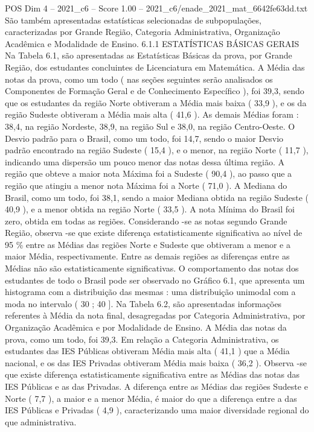 \begin{textsample}{POS Dim 4 – 2021\_c6 – Score 1.00 – 2021\_c6/enade\_2021\_mat\_6642fe63dd.txt}
São também apresentadas estatísticas selecionadas de subpopulações, caracterizadas por Grande Região, Categoria Administrativa, Organização Acadêmica e Modalidade de Ensino. 6.1.1 ESTATÍSTICAS BÁSICAS GERAIS Na Tabela 6.1, são apresentadas as Estatísticas Básicas da prova, por Grande Região, dos estudantes concluintes de Licenciatura em Matemática.
A Média das notas da prova, como um todo ( nas seções seguintes serão analisados os Componentes de Formação Geral e de Conhecimento Específico ), foi 39,3, sendo que os estudantes da região Norte obtiveram a Média mais baixa ( 33,9 ), e os da região Sudeste obtiveram a Média mais alta ( 41,6 ).
As demais Médias foram : 38,4, na região Nordeste, 38,9, na região Sul e 38,0, na região Centro-Oeste.
O Desvio padrão para o Brasil, como um todo, foi 14,7, sendo o maior Desvio padrão encontrado na região Sudeste ( 15,4 ), e o menor, na região Norte ( 11,7 ), indicando uma dispersão um pouco menor das notas dessa última região.
A região que obteve a maior nota Máxima foi a Sudeste ( 90,4 ), ao passo que a região que atingiu a menor nota Máxima foi a Norte ( 71,0 ).
A Mediana do Brasil, como um todo, foi 38,1, sendo a maior Mediana obtida na região Sudeste ( 40,9 ), e a menor obtida na região Norte ( 33,5 ).
A nota Mínima do Brasil foi zero, obtida em todas as regiões.
Considerando -se as notas segundo Grande Região, observa -se que existe diferença estatisticamente significativa ao nível de 95 \% entre as Médias das regiões Norte e Sudeste que obtiveram a menor e a maior Média, respectivamente.
Entre as demais regiões as diferenças entre as Médias não são estatisticamente significativas.
O comportamento das notas dos estudantes de todo o Brasil pode ser observado no Gráfico 6.1, que apresenta um histograma com a distribuição das mesmas : uma distribuição unimodal com a moda no intervalo ( 30 ; 40 ].
Na Tabela 6.2, são apresentadas informações referentes à Média da nota final, desagregadas por Categoria Administrativa, por Organização Acadêmica e por Modalidade de Ensino.
A Média das notas da prova, como um todo, foi 39,3.
Em relação a Categoria Administrativa, os estudantes das IES Públicas obtiveram Média mais alta ( 41,1 ) que a Média nacional, e os das IES Privadas obtiveram Média mais baixa ( 36,2 ).
Observa -se que existe diferença estatisticamente significativa entre as Médias das notas das IES Públicas e as das Privadas.
A diferença entre as Médias das regiões Sudeste e Norte ( 7,7 ), a maior e a menor Média, é maior do que a diferença entre a das IES Públicas e Privadas ( 4,9 ), caracterizando uma maior diversidade regional do que administrativa.

\end{textsample}
